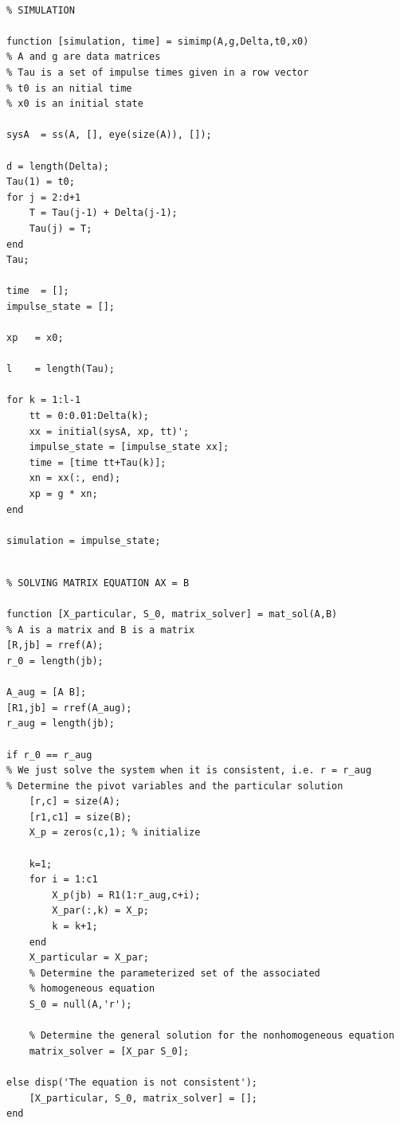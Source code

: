 \documentclass[11pt,a4paper]{article}
\begin{document}
\begin{appendices}
\begin{verbatim}

% SIMULATION

function [simulation, time] = simimp(A,g,Delta,t0,x0)
% A and g are data matrices
% Tau is a set of impulse times given in a row vector
% t0 is an nitial time
% x0 is an initial state

sysA  = ss(A, [], eye(size(A)), []);

d = length(Delta);
Tau(1) = t0;
for j = 2:d+1
    T = Tau(j-1) + Delta(j-1);
    Tau(j) = T;
end
Tau;

time  = [];
impulse_state = [];

xp   = x0;

l    = length(Tau);

for k = 1:l-1
    tt = 0:0.01:Delta(k);
    xx = initial(sysA, xp, tt)';
    impulse_state = [impulse_state xx];
    time = [time tt+Tau(k)];
    xn = xx(:, end);
    xp = g * xn;
end

simulation = impulse_state;
\end{verbatim}

\begin{verbatim}

% SOLVING MATRIX EQUATION AX = B

function [X_particular, S_0, matrix_solver] = mat_sol(A,B)
% A is a matrix and B is a matrix
[R,jb] = rref(A);
r_0 = length(jb);
  
A_aug = [A B];
[R1,jb] = rref(A_aug);
r_aug = length(jb);

if r_0 == r_aug
% We just solve the system when it is consistent, i.e. r = r_aug
% Determine the pivot variables and the particular solution
    [r,c] = size(A);
    [r1,c1] = size(B);
    X_p = zeros(c,1); % initialize
    
    k=1;
    for i = 1:c1
        X_p(jb) = R1(1:r_aug,c+i);
        X_par(:,k) = X_p;
        k = k+1;
    end
    X_particular = X_par;
    % Determine the parameterized set of the associated
    % homogeneous equation
    S_0 = null(A,'r');

    % Determine the general solution for the nonhomogeneous equation
    matrix_solver = [X_par S_0];
    
else disp('The equation is not consistent');
    [X_particular, S_0, matrix_solver] = [];
end

\end{verbatim}
\end{appendices}
\end{document}
